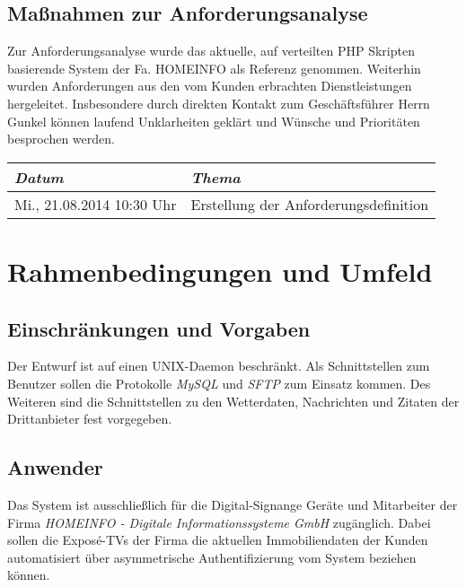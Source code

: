 \documentclass[a4paper]{article}
\begin{document}
	\subsection{Maßnahmen zur Anforderungsanalyse}
	Zur Anforderungsanalyse wurde das aktuelle, auf verteilten PHP Skripten basierende System der Fa. HOMEINFO als Referenz genommen. Weiterhin wurden Anforderungen aus den vom Kunden erbrachten Dienstleistungen hergeleitet.
	Insbesondere durch direkten Kontakt zum Geschäftsführer Herrn Gunkel können laufend Unklarheiten geklärt und Wünsche und Prioritäten besprochen werden.
	
	\begin{tabular}{|p{4cm}|p{}|}
		\hline
		\emph{Datum} & \emph{Thema} \\
		\hline
		Mi., 21.08.2014 10:30 Uhr & Erstellung der Anforderungsdefinition \\
		\hline
	\end{tabular}
	
	\section{Rahmenbedingungen und Umfeld}	
	\subsection{Einschränkungen und Vorgaben}
	Der Entwurf ist auf einen UNIX-Daemon beschränkt. Als Schnittstellen zum Benutzer sollen die Protokolle \emph{MySQL} und \emph{SFTP} zum Einsatz kommen. Des Weiteren sind die Schnittstellen zu den Wetterdaten, Nachrichten und Zitaten der Drittanbieter fest vorgegeben.
	
	\subsection{Anwender}
	Das System ist ausschließlich für die Digital-Signange Geräte und Mitarbeiter der Firma \emph{HOMEINFO - Digitale Informationssysteme GmbH} zugänglich.
	Dabei sollen die Exposé-TVs der Firma die aktuellen Immobiliendaten der Kunden automatisiert über asymmetrische Authentifizierung vom System beziehen können.
	\linebreak
	
\end{document}
